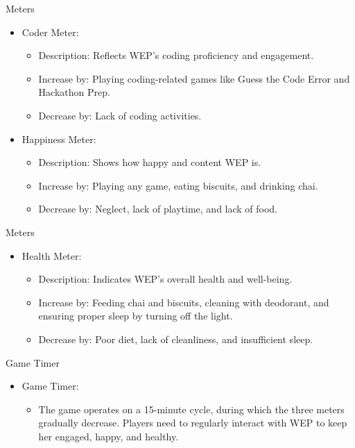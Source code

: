 \documentclass{beamer}
\begin{document}
\begin{frame}{Meters}
\begin{itemize}
    \item Coder Meter:
    \begin{itemize}
        \item Description: Reflects WEP's coding proficiency and engagement.
        \item Increase by: Playing coding-related games like Guess the Code Error and Hackathon Prep.
        \item Decrease by: Lack of coding activities.
    \end{itemize}
    \item Happiness Meter:
    \begin{itemize}
        \item Description: Shows how happy and content WEP is.
        \item Increase by: Playing any game, eating biscuits, and drinking chai.
        \item Decrease by: Neglect, lack of playtime, and lack of food.
    \end{itemize}
\end{itemize}
\end{frame}

\begin{frame}{Meters}
\begin{itemize}
    \item Health Meter:
    \begin{itemize}
        \item Description: Indicates WEP's overall health and well-being.
        \item Increase by: Feeding chai and biscuits, cleaning with deodorant, and ensuring proper sleep by turning off the light.
        \item Decrease by: Poor diet, lack of cleanliness, and insufficient sleep.
    \end{itemize}
\end{itemize}
\end{frame}

\begin{frame}{Game Timer}
\begin{itemize}
    \item Game Timer:  
    \begin{itemize}
        \item The game operates on a 15-minute cycle, during which the three meters gradually decrease. Players need to regularly interact with WEP to keep her engaged, happy, and healthy.
    \end{itemize}
\end{itemize}
\end{frame}
\end{document}

